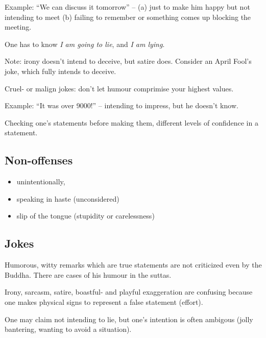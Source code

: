 Example: ``We can discuss it tomorrow'' -- (a) just to make him happy
but not intending to meet (b) failing to remember or something comes up
blocking the meeting.

One has to know \emph{I am going to lie}, and \emph{I am lying}.

Note: irony doesn't intend to deceive, but satire does. Consider an
April Fool's joke, which fully intends to deceive.

Cruel- or malign jokes: don't let humour comprimise your highest values.

Example: ``It was over 9000!'' -- intending to impress, but he doesn't
know.

Checking one's statements before making them, different levels of
confidence in a statement.

%
%

\subsection{Non-offenses}

\begin{itemize}
\tightlist
\item
  unintentionally,
\item
  speaking in haste (unconsidered)
\item
  slip of the tongue (stupidity or carelessness)
\end{itemize}

\clearpage

\subsection{Jokes}

Humorous, witty remarks which are true statements are not criticized
even by the Buddha. There are cases of his humour in the suttas.

Irony, sarcasm, satire, boastful- and playful exaggeration are confusing
because one makes physical signs to represent a false statement
(effort).

One may claim not intending to lie, but one's intention is often
ambigous (jolly bantering, wanting to avoid a situation).

